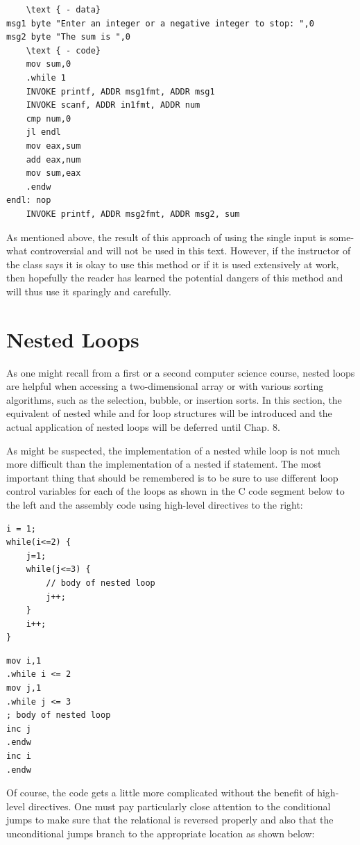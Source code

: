 \documentclass[10pt]{book}
\begin{document}
\begin{verbatim}
    \text { - data}
msg1 byte "Enter an integer or a negative integer to stop: ",0
msg2 byte "The sum is ",0
    \text { - code}
    mov sum,0
    .while 1
    INVOKE printf, ADDR msg1fmt, ADDR msg1
    INVOKE scanf, ADDR in1fmt, ADDR num
    cmp num,0
    jl endl
    mov eax,sum
    add eax,num
    mov sum,eax
    .endw
endl: nop
    INVOKE printf, ADDR msg2fmt, ADDR msg2, sum
\end{verbatim}

As mentioned above, the result of this approach of using the single input is some-what controversial and will not be used in this text. However, if the instructor of the class says it is okay to use this method or if it is used extensively at work, then hopefully the reader has learned the potential dangers of this method and will thus use it sparingly and carefully.

\section{Nested Loops}
As one might recall from a first or a second computer science course, nested loops are helpful when accessing a two-dimensional array or with various sorting algorithms, such as the selection, bubble, or insertion sorts. In this section, the equivalent of nested while and for loop structures will be introduced and the actual application of nested loops will be deferred until Chap. 8.

As might be suspected, the implementation of a nested while loop is not much more difficult than the implementation of a nested if statement. The most important thing that should be remembered is to be sure to use different loop control variables for each of the loops as shown in the C code segment below to the left and the assembly code using high-level directives to the right:

\begin{verbatim}
i = 1;
while(i<=2) {
    j=1;
    while(j<=3) {
        // body of nested loop
        j++;
    }
    i++;
}
\end{verbatim}

\begin{verbatim}
mov i,1
.while i <= 2
mov j,1
.while j <= 3
; body of nested loop
inc j
.endw
inc i
.endw
\end{verbatim}

Of course, the code gets a little more complicated without the benefit of high-level directives. One must pay particularly close attention to the conditional jumps to make sure that the relational is reversed properly and also that the unconditional jumps branch to the appropriate location as shown below:
\end{document}
